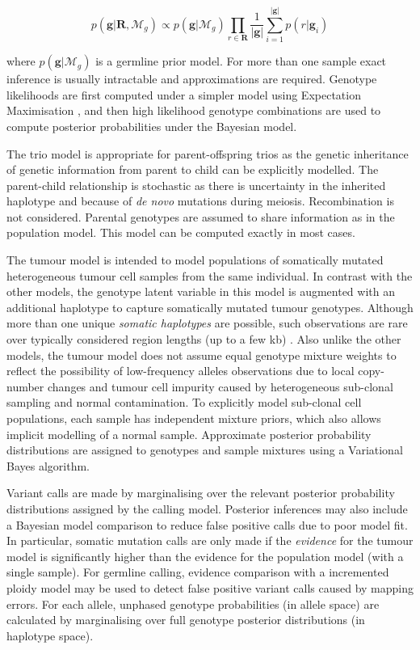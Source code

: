 \documentclass[notitlepage, twocolumn]{article}
\begin{document}
\begin{equation*}
    p(\boldsymbol{g} | \boldsymbol{R}, \mathcal{M}_{g}) \propto p(\boldsymbol{g} | \mathcal{M}_{g}) \prod_{r \in \boldsymbol{R}} \frac{1}{|\boldsymbol{g}|} \sum_{i = 1}^{|\boldsymbol{g}|} p(r | \boldsymbol{g}_i)
\end{equation*}

where $p(\boldsymbol{g} | \mathcal{M}_{g})$ is a germline prior model. For more than one sample exact inference is usually intractable and approximations are required. Genotype likelihoods are first computed under a simpler model using Expectation Maximisation \cite{platypus}, and then high likelihood genotype combinations are used to compute posterior probabilities under the Bayesian model.

The trio model is appropriate for parent-offspring trios as the genetic inheritance of genetic information from parent to child can be explicitly modelled. The parent-child relationship is stochastic as there is uncertainty in the inherited haplotype and because of \emph{de novo} mutations during meiosis. Recombination is not considered. Parental genotypes are assumed to share information as in the population model. This model can be computed exactly in most cases.

The tumour model is intended to model populations of somatically mutated heterogeneous tumour cell samples from the same individual. In contrast with the other models, the genotype latent variable in this model is augmented with an additional haplotype to capture somatically mutated tumour genotypes. Although more than one unique \emph{somatic haplotypes} are possible, such observations are rare over typically considered region lengths (up to a few kb) \cite{rare-somatic}. Also unlike the other models, the tumour model does not assume equal genotype mixture weights to reflect the possibility of low-frequency alleles observations due to local copy-number changes and tumour cell impurity caused by heterogeneous sub-clonal sampling and normal contamination. To explicitly model sub-clonal cell populations, each sample has independent mixture priors, which also allows implicit modelling of a normal sample. Approximate posterior probability distributions are assigned to genotypes and sample mixtures using a Variational Bayes algorithm.

Variant calls are made by marginalising over the relevant posterior probability distributions assigned by the calling model. Posterior inferences may also include a Bayesian model comparison to reduce false positive calls due to poor model fit. In particular, somatic mutation calls are only made if the \emph{evidence} for the tumour model is significantly higher than the evidence for the population model (with a single sample). For germline calling, evidence comparison with a incremented ploidy model may be used to detect false positive variant calls caused by mapping errors. For each allele, unphased genotype probabilities (in allele space) are calculated by marginalising over full genotype posterior distributions (in haplotype space).
\end{document}
